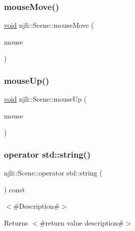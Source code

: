 \subsubsection{\texorpdfstring{mouse\+Move()}{mouseMove()}}
{\footnotesize\ttfamily \mbox{\hyperlink{_thread_8h_af1e856da2e658414cb2456cb6f7ebc66}{void}} njli\+::\+Scene\+::mouse\+Move (\begin{DoxyParamCaption}\item[{const \mbox{\hyperlink{classnjli_1_1_device_mouse}{Device\+Mouse}} \&}]{mouse }\end{DoxyParamCaption})}

\mbox{\label{classnjli_1_1_scene_a2b765b00a1f01803ed6c06556751af80}} 
\subsubsection{\texorpdfstring{mouse\+Up()}{mouseUp()}}
{\footnotesize\ttfamily \mbox{\hyperlink{_thread_8h_af1e856da2e658414cb2456cb6f7ebc66}{void}} njli\+::\+Scene\+::mouse\+Up (\begin{DoxyParamCaption}\item[{const \mbox{\hyperlink{classnjli_1_1_device_mouse}{Device\+Mouse}} \&}]{mouse }\end{DoxyParamCaption})}

\mbox{\label{classnjli_1_1_scene_a264f0ffff37c50ec083d14305484d33c}} 
\subsubsection{\texorpdfstring{operator std\+::string()}{operator std::string()}}
{\footnotesize\ttfamily njli\+::\+Scene\+::operator std\+::string (\begin{DoxyParamCaption}{ }\end{DoxyParamCaption}) const\hspace{0.3cm}{\ttfamily [virtual]}}

$<$\#\+Description\#$>$

\begin{DoxyReturn}{Returns}
$<$\#return value description\#$>$ 
\end{DoxyReturn}


